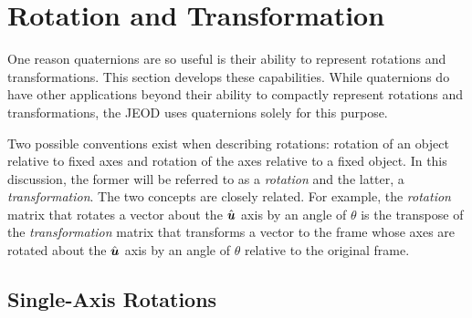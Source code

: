 \section{Rotation and Transformation}\label{sec:app_rot_trans}

One reason quaternions are so useful is their ability
to represent rotations and transformations.
This section develops these capabilities.
While quaternions do have other applications beyond their ability to compactly
represent rotations and transformations, the JEOD uses
quaternions solely for this purpose.

Two possible conventions exist when describing rotations:
rotation of an object relative to fixed axes and rotation of the axes
relative to a fixed object.
In this discussion, the former will be referred to
as a \emph{rotation} and the latter, a \emph{transformation}.
The two concepts are closely related.
For example, the \emph{rotation} matrix that rotates a vector
about the $\hat{\boldsymbol{u}}$ axis by an angle of $\theta$
is the transpose of the \emph{transformation} matrix that transforms
a vector to the frame whose axes are rotated about the $\hat{\boldsymbol{u}}$ axis
by an angle of $\theta$ relative to the original frame.

\subsection{Single-Axis Rotations}\label{sec:app_single_axis}

